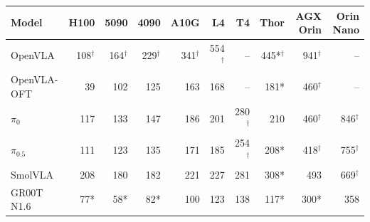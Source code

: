 \begin{tabular}{lrrrrrrrrr}
\toprule
Model & H100 & 5090 & 4090 & A10G & L4 & T4 & Thor & AGX Orin & Orin Nano \\
\midrule
OpenVLA & 108$^\dagger$ & 164$^\dagger$ & 229$^\dagger$ & 341$^\dagger$ & 554$^\dagger$ & -- & 445*$^\dagger$ & 941$^\dagger$ & -- \\
OpenVLA-OFT & 39 & 102 & 125 & 163 & 168 & -- & 181* & 460$^\dagger$ & -- \\
$\pi_0$ & 117 & 133 & 147 & 186 & 201 & 280$^\dagger$ & 210 & 460$^\dagger$ & 846$^\dagger$ \\
$\pi_{0.5}$ & 111 & 123 & 135 & 171 & 185 & 254$^\dagger$ & 208* & 418$^\dagger$ & 755$^\dagger$ \\
SmolVLA & 208 & 180 & 182 & 221 & 227 & 281 & 308* & 493 & 669$^\dagger$ \\
GR00T N1.6 & 77* & 58* & 82* & 100 & 123 & 138 & 117* & 300* & 358 \\
\bottomrule
\end{tabular}
